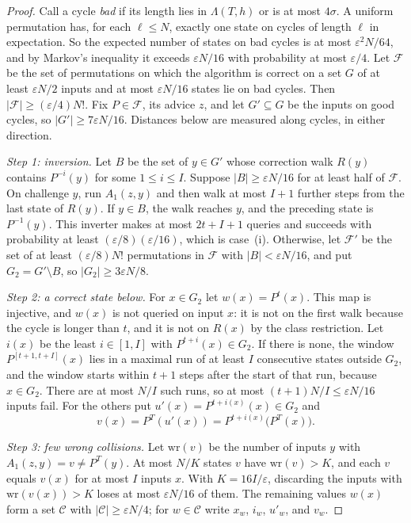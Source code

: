 \documentclass[11pt]{article}
\theoremstyle{definition}
\theoremstyle{remark}
\numberwithin{equation}{section}
\begin{document}
\begin{proof}
Call a cycle \emph{bad} if its length lies in $\Lambda(T,h)$ or is at most
$4\sigma$.  A uniform permutation has, for each $\ell\leq N$, exactly one
state on cycles of length $\ell$ in expectation.  So the expected number
of states on bad cycles is at most $\varepsilon^2N/64$, and by Markov's
inequality it exceeds $\varepsilon N/16$ with probability at most
$\varepsilon/4$.  Let $\mathcal F$ be the set of permutations on which the
algorithm is correct on a set $G$ of at least $\varepsilon N/2$ inputs and
at most $\varepsilon N/16$ states lie on bad cycles.  Then
$|\mathcal F|\geq(\varepsilon/4)N!$.  Fix $P\in\mathcal F$, its advice $z$,
and let $G'\subseteq G$ be the inputs on good cycles, so
$|G'|\geq7\varepsilon N/16$.  Distances below are measured along cycles,
in either direction.

\emph{Step 1: inversion.}  Let $B$ be the set of $y\in G'$ whose
correction walk $R(y)$ contains $P^{-i}(y)$ for some $1\leq i\leq I$.
Suppose $|B|\geq\varepsilon N/16$ for at least half of $\mathcal F$.  On
challenge $y$, run $A_1(z,y)$ and then walk at most $I+1$ further steps
from the last state of $R(y)$.  If $y\in B$, the walk reaches $y$, and the
preceding state is $P^{-1}(y)$.  This inverter makes at most $2t+I+1$
queries and succeeds with probability at least
$(\varepsilon/8)(\varepsilon/16)$, which is case~(i).  Otherwise, let
$\mathcal F'$ be the set of at least $(\varepsilon/8)N!$ permutations in
$\mathcal F$ with $|B|<\varepsilon N/16$, and put $G_2=G'\setminus B$, so
$|G_2|\geq3\varepsilon N/8$.

\emph{Step 2: a correct state below.}  For $x\in G_2$ let $w(x)=P^t(x)$.
This map is injective, and $w(x)$ is not queried on input $x$: it is not
on the first walk because the cycle is longer than $t$, and it is not on
$R(x)$ by the class restriction.  Let $i(x)$ be the least $i\in[1,I]$ with
$P^{t+i}(x)\in G_2$.  If there is none, the window
$P^{[t+1,t+I]}(x)$ lies in a maximal run of at least $I$ consecutive
states outside $G_2$, and the window starts within $t+1$ steps after the
start of that run, because $x\in G_2$.  There are at most $N/I$ such runs,
so at most $(t+1)N/I\leq\varepsilon N/16$ inputs fail.  For the others put
$u'(x)=P^{t+i(x)}(x)\in G_2$ and
\[
  v(x)=P^T(u'(x))=P^{t+i(x)}\bigl(P^T(x)\bigr).
\]

\emph{Step 3: few wrong collisions.}  Let $\mathrm{wr}(v)$ be the number of
inputs $y$ with $A_1(z,y)=v\neq P^T(y)$.  At most $N/K$ states $v$ have
$\mathrm{wr}(v)>K$, and each $v$ equals $v(x)$ for at most $I$ inputs $x$.
With $K=16I/\varepsilon$, discarding the inputs with
$\mathrm{wr}(v(x))>K$ loses at most $\varepsilon N/16$ of them.  The
remaining values $w(x)$ form a set $\mathcal C$ with
$|\mathcal C|\geq\varepsilon N/4$; for $w\in\mathcal C$ write $x_w$,
$i_w$, $u'_w$, and $v_w$.


\end{proof}
\end{document}
